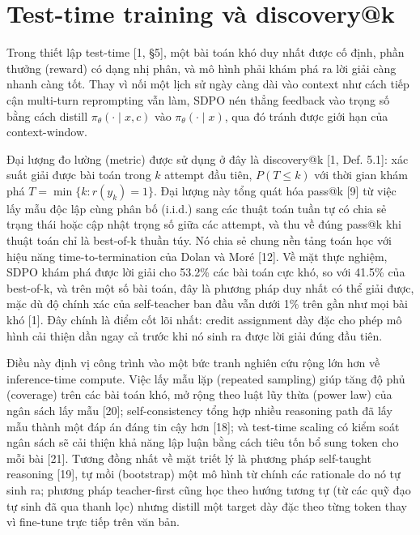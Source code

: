 \section{Test-time training và discovery@k}\label{test-time-training-and-discoveryk}

Trong thiết lập test-time {[}1, §5{]}, một bài toán khó duy nhất được cố định, phần thưởng (reward) có dạng nhị phân, và mô hình phải khám phá ra lời giải càng nhanh càng tốt. Thay vì nối một lịch sử ngày càng dài vào context như cách tiếp cận multi-turn reprompting vẫn làm, SDPO nén thẳng feedback vào trọng số bằng cách distill \(\pi_\theta(\cdot \mid x, c)\) vào \(\pi_\theta(\cdot \mid x)\), qua đó tránh được giới hạn của context-window.

Đại lượng đo lường (metric) được sử dụng ở đây là discovery@k {[}1, Def. 5.1{]}: xác suất giải được bài toán trong \(k\) attempt đầu tiên, \(P(T \le k)\) với thời gian khám phá \(T = \min\{k : r(y_k) = 1\}\). Đại lượng này tổng quát hóa pass@k {[}9{]} từ việc lấy mẫu độc lập cùng phân bố (i.i.d.) sang các thuật toán tuần tự có chia sẻ trạng thái hoặc cập nhật trọng số giữa các attempt, và thu về đúng pass@k khi thuật toán chỉ là best-of-k thuần túy. Nó chia sẻ chung nền tảng toán học với hiệu năng time-to-termination của Dolan và Moré {[}12{]}. Về mặt thực nghiệm, SDPO khám phá được lời giải cho 53.2\% các bài toán cực khó, so với 41.5\% của best-of-k, và trên một số bài toán, đây là phương pháp duy nhất có thể giải được, mặc dù độ chính xác của self-teacher ban đầu vẫn dưới 1\% trên gần như mọi bài khó {[}1{]}. Đây chính là điểm cốt lõi nhất: credit assignment dày đặc cho phép mô hình cải thiện dần ngay cả trước khi nó sinh ra được lời giải đúng đầu tiên.

Điều này định vị công trình vào một bức tranh nghiên cứu rộng lớn hơn về inference-time compute. Việc lấy mẫu lặp (repeated sampling) giúp tăng độ phủ (coverage) trên các bài toán khó, mở rộng theo luật lũy thừa (power law) của ngân sách lấy mẫu {[}20{]}; self-consistency tổng hợp nhiều reasoning path đã lấy mẫu thành một đáp án đáng tin cậy hơn {[}18{]}; và test-time scaling có kiểm soát ngân sách sẽ cải thiện khả năng lập luận bằng cách tiêu tốn bổ sung token cho mỗi bài {[}21{]}. Tương đồng nhất về mặt triết lý là phương pháp self-taught reasoning {[}19{]}, tự mồi (bootstrap) một mô hình từ chính các rationale do nó tự sinh ra; phương pháp teacher-first cũng học theo hướng tương tự (từ các quỹ đạo tự sinh đã qua thanh lọc) nhưng distill một target dày đặc theo từng token thay vì fine-tune trực tiếp trên văn bản.


